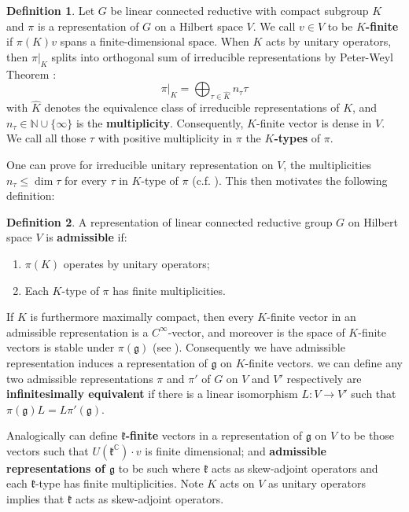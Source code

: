 \documentclass[11pt]{report}
\theoremstyle{definition}
\newtheorem{Def}{Definition}[chapter]
\theoremstyle{plain}
\newcommand{\nat}{\mathbb{N}}
\newcommand{\complex}{\mathbb{C}}
\renewcommand{\hat}{\widehat}
\newcommand{\Lie}[1]{\mathfrak{#1}}
\begin{document}
\begin{Def}\label{borel205}
	Let $G$ be linear connected reductive with compact subgroup $K$ and $\pi$ is a representation of $G$ on a Hilbert space $V$. We call $v\in V$ to be \textbf{$K$-finite} if $\pi(K)v$ spans a finite-dimensional space. When $K$ acts by unitary operators, then $\pi|_K$ splits into orthogonal sum of irreducible representations by Peter-Weyl Theorem \cite[Theorem~1.12]{knapp2016}:
	\begin{equation}\label{knapp(8.5)}
	\pi|_K=\bigoplus_{\tau \in \hat{K}}n_\tau \tau
	\end{equation} 
	with $\hat{K}$ denotes the equivalence class of irreducible representations of $K$, and $n_\tau\in \nat\cup \{\infty \}$ is the \textbf{multiplicity}. Consequently, $K$-finite vector is dense in $V$. We call all those $\tau$ with positive multiplicity in $\pi$ the \textbf{$K$-types} of $\pi$.
\end{Def}
One can prove for irreducible unitary representation on $V$, the multiplicities $n_\tau\leq \dim\tau$ for every $\tau$ in $K$-type of $\pi$ (c.f. \cite[Theorem~8.1]{knapp2016}). This then motivates the following definition:
\begin{Def}
	A representation of linear connected reductive group $G$ on Hilbert space $V$ is \textbf{admissible} if:
	\begin{enumerate}
		\item $\pi(K)$ operates by unitary operators;
		\item Each $K$-type of $\pi$ has finite multiplicities.
	\end{enumerate}
\end{Def}
If $K$ is furthermore maximally compact, then every $K$-finite vector in an admissible representation is a $C^\infty$-vector, and moreover is the space of $K$-finite vectors is stable under $\pi(\Lie{g})$ (see \cite[Proposition~8.5]{knapp2016}). Consequently we have admissible representation induces a representation of $\Lie{g}$ on $K$-finite vectors. we can define any two admissible representations $\pi$ and $\pi'$ of $G$ on $V$ and $V'$ respectively are \textbf{infinitesimally equivalent} if there is a linear isomorphism $L:V\to V'$ such that $\pi(\Lie{g})L=L\pi'(\Lie{g})$. 
\par Analogically can define \textbf{$\Lie{k}$-finite} vectors in a representation of $\Lie{g}$ on $V$ to be those vectors such that $U(\Lie{k}^\complex)\cdot v$ is finite dimensional; and \textbf{admissible representations of $\Lie{g}$} to be such where $\Lie{k}$ acts as skew-adjoint operators and each $\Lie{k}$-type has finite multiplicities. Note $K$ acts on $V$ as unitary operators implies that $\Lie{k}$ acts as skew-adjoint operators. 
\end{document}

